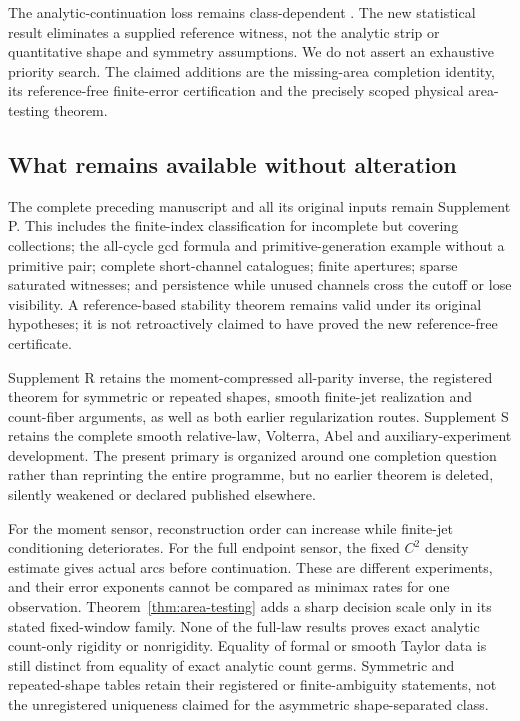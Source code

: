 The analytic-continuation loss remains class-dependent \cite{Trefethen}.
The new statistical result eliminates a supplied reference witness,
not the analytic strip or quantitative shape and symmetry assumptions.
We do not assert an exhaustive priority search. The claimed additions
are the missing-area completion identity, its reference-free finite-error
certification and the precisely scoped physical area-testing theorem.

\subsection{What remains available without alteration}
The complete preceding manuscript and all its original inputs remain
Supplement P. This includes the finite-index classification for incomplete
but covering collections; the all-cycle gcd formula and primitive-generation
example without a primitive pair; complete short-channel catalogues;
finite apertures; sparse saturated witnesses; and persistence while unused
channels cross the cutoff or lose visibility. A reference-based stability
theorem remains valid under its original hypotheses; it is not retroactively
claimed to have proved the new reference-free certificate.

Supplement R retains the moment-compressed all-parity inverse, the
registered theorem for symmetric or repeated shapes, smooth finite-jet
realization and count-fiber arguments, as well as both earlier regularization
routes. Supplement S retains the complete smooth relative-law, Volterra,
Abel and auxiliary-experiment development. The present primary is organized
around one completion question rather than reprinting the entire programme,
but no earlier theorem is deleted, silently weakened or declared published
elsewhere.

For the moment sensor, reconstruction order can increase while finite-jet
conditioning deteriorates. For the full endpoint sensor, the fixed
$C^2$ density estimate gives actual arcs before continuation. These are
different experiments, and their error exponents cannot be compared as
minimax rates for one observation. Theorem~\ref{thm:area-testing} adds
a sharp decision scale only in its stated fixed-window family. None of
the full-law results proves exact analytic count-only rigidity or
nonrigidity. Equality of formal or smooth Taylor data is still distinct
from equality of exact analytic count germs. Symmetric and repeated-shape
tables retain their registered or finite-ambiguity statements, not the
unregistered uniqueness claimed for the asymmetric shape-separated class.
